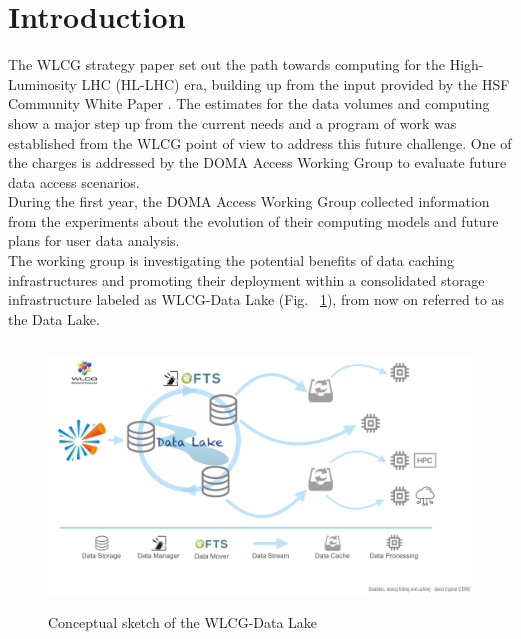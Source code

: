 \section{Introduction}
The WLCG strategy paper \cite{wlcgstrategy} set out the path towards computing for the High-Luminosity LHC (HL-LHC) era, building up from the input provided by the HSF \cite{hsf} Community White Paper \cite{cwp}.
The estimates for the data volumes and computing show a major step up from the current needs and a program of work was established from the WLCG point of view to address this future challenge. One of the charges is addressed by the DOMA Access Working Group to evaluate future data access scenarios.\\
During the first year, the DOMA Access Working Group collected information from the experiments about the evolution of their computing models and future plans for user data analysis.\\
The working group is investigating the potential benefits of data caching infrastructures and promoting their deployment within a consolidated storage infrastructure labeled as WLCG-Data Lake (Fig. ~\ref{datalake-concept}), from now on referred to as the Data Lake.

\begin{figure}
  \centering
  \includegraphics[height=7cm]{datalake-concept-sketch.png}
  \caption{{\em} Conceptual sketch of the WLCG-Data Lake }
  \label{datalake-concept}
\end{figure}



